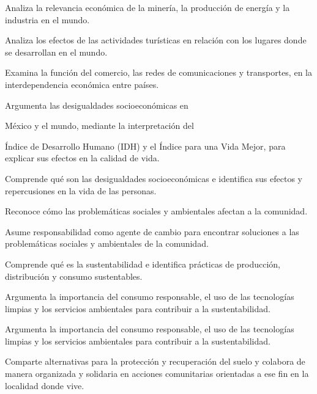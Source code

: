 \item Analiza la relevancia económica de la minería, la producción de energía y la industria en el mundo.
\item Analiza los efectos de las actividades turísticas en relación con los lugares donde se desarrollan en el mundo.
\item Examina la función del comercio, las redes de comunicaciones y transportes, en la interdependencia económica entre países.
\item Argumenta las desigualdades socioeconómicas en
\item México y el mundo, mediante la interpretación del
\item Índice de Desarrollo Humano (IDH) y el Índice para una Vida Mejor, para explicar sus efectos en la calidad de vida.
\item Comprende qué son las desigualdades socioeconómicas e identifica sus efectos y repercusiones en la vida de las personas.
\item Reconoce cómo las problemáticas sociales y ambientales afectan a la comunidad.
\item Asume responsabilidad como agente de cambio para encontrar soluciones a las problemáticas sociales y ambientales de la comunidad.
\item Comprende qué es la sustentabilidad e identifica prácticas de producción, distribución y consumo sustentables.
\item Argumenta la importancia del consumo responsable, el uso de las tecnologías limpias y los servicios ambientales para contribuir a la sustentabilidad.
\item Argumenta la importancia del consumo responsable, el uso de las tecnologías limpias y los servicios ambientales para contribuir a la sustentabilidad.
\item Comparte alternativas para la protección y recuperación del suelo y colabora de manera organizada y solidaria en acciones comunitarias orientadas a ese fin en la localidad donde vive.